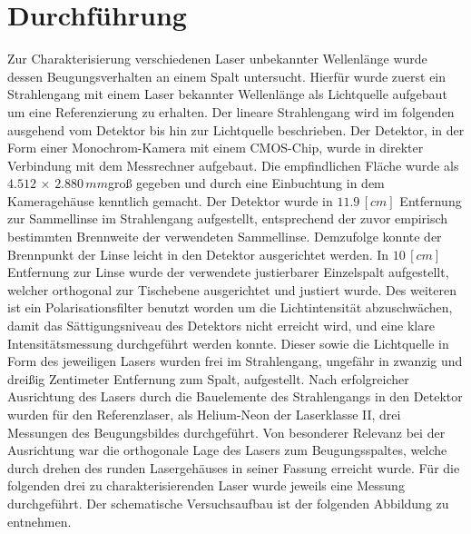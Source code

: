 %
%
\section{Durchführung}
Zur Charakterisierung verschiedenen Laser unbekannter Wellenlänge wurde dessen Beugungsverhalten an einem Spalt untersucht. Hierfür wurde zuerst ein Strahlengang mit einem Laser bekannter Wellenlänge als Lichtquelle aufgebaut um eine Referenzierung zu erhalten. Der lineare Strahlengang wird im folgenden ausgehend vom Detektor bis hin zur Lichtquelle beschrieben. Der Detektor, in der Form einer Monochrom-Kamera mit einem CMOS-Chip, wurde in direkter Verbindung mit dem Messrechner aufgebaut. Die empfindlichen Fläche wurde als $4.512$ × $2.880\,\si{mm}$groß gegeben und durch eine Einbuchtung in dem Kameragehäuse kenntlich gemacht. Der Detektor wurde in $11.9 \,[\si{cm}]$ Entfernung zur Sammellinse im Strahlengang aufgestellt, entsprechend der zuvor empirisch bestimmten Brennweite der verwendeten Sammellinse. Demzufolge konnte der Brennpunkt der Linse leicht in den Detektor ausgerichtet werden. In $10 \,[\si{cm}]$ Entfernung zur Linse wurde der verwendete justierbarer Einzelspalt aufgestellt, welcher orthogonal zur Tischebene ausgerichtet und justiert wurde. Des weiteren ist ein Polarisationsfilter benutzt worden um die Lichtintensität abzuschwächen, damit das Sättigungsniveau des Detektors nicht erreicht wird, und eine klare Intensitätsmessung durchgeführt werden konnte. Dieser sowie die Lichtquelle in Form des jeweiligen Lasers wurden frei im Strahlengang, ungefähr in zwanzig und dreißig Zentimeter Entfernung zum Spalt, aufgestellt. Nach erfolgreicher Ausrichtung des Lasers durch die Bauelemente des Strahlengangs in den Detektor wurden für den Referenzlaser, als Helium-Neon der Laserklasse II, drei Messungen des Beugungsbildes durchgeführt. Von besonderer Relevanz bei der Ausrichtung war die orthogonale Lage des Lasers zum Beugungsspaltes, welche durch drehen des runden Lasergehäuses in seiner Fassung erreicht wurde. Für die folgenden drei zu charakterisierenden Laser wurde jeweils eine Messung durchgeführt. Der schematische Versuchsaufbau ist der folgenden Abbildung zu entnehmen. 
\\
